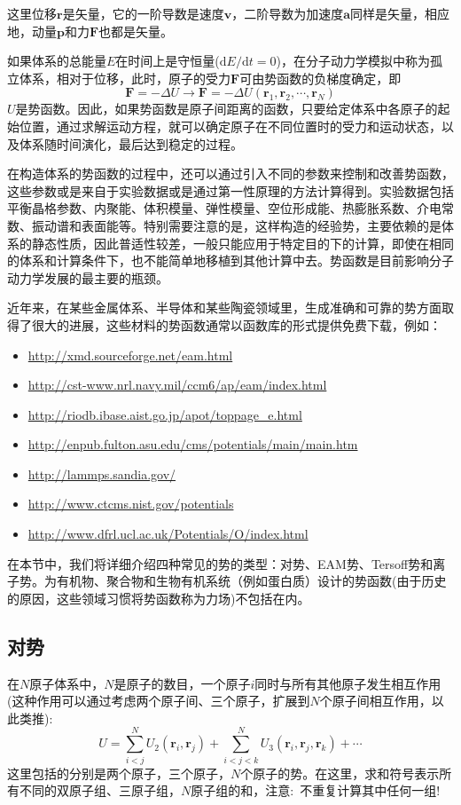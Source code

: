 这里位移$\mathbf{r}$是矢量，它的一阶导数是速度$\mathbf{v}$，二阶导数为加速度$\mathbf{a}$同样是矢量，相应地，动量$\mathbf{p}$和力$\mathbf{F}$也都是矢量。

如果体系的总能量$E$在时间上是守恒量($\mathrm{d}E/\mathrm{d}t=0$)，在分子动力学模拟中称为孤立体系，相对于位移，此时，原子的受力$\mathbf{F}$可由势函数的负梯度确定，即
\begin{equation}
	\mathbf{F}=-\Delta U\rightarrow\mathbf{F}=-\Delta U(\mathbf{r}_1,\mathbf{r}_2,\cdots,\mathbf{r}_N)
	\label{eq:Force_Potential}
\end{equation}
$U$是势函数。因此，如果势函数是原子间距离的函数，只要给定体系中各原子的起始位置，通过求解运动方程，就可以确定原子在不同位置时的受力和运动状态，以及体系随时间演化，最后达到稳定的过程。

在构造体系的势函数的过程中，还可以通过引入不同的参数来控制和改善势函数，这些参数或是来自于实验数据或是通过第一性原理的方法计算得到。实验数据包括平衡晶格参数、内聚能、体积模量、弹性模量、空位形成能、热膨胀系数、介电常数、振动谱和表面能等。特别需要注意的是，这样构造的经验势，主要依赖的是体系的静态性质，因此普适性较差，一般只能应用于特定目的下的计算，即使在相同的体系和计算条件下，也不能简单地移植到其他计算中去。势函数是目前影响分子动力学发展的最主要的瓶颈。

近年来，在某些金属体系、半导体和某些陶瓷领域里，生成准确和可靠的势方面取得了很大的进展，这些材料的势函数通常以函数库的形式提供免费下载，例如：
\begin{itemize}
	\item \url{http://xmd.sourceforge.net/eam.html}
	\item \url{http://cst-www.nrl.navy.mil/ccm6/ap/eam/index.html}
	\item \url{http://riodb.ibase.aist.go.jp/apot/toppage_e.html}
	\item \url{http://enpub.fulton.asu.edu/cms/potentials/main/main.htm}
	\item \url{http://lammps.sandia.gov/}
	\item \url{http://www.ctcms.nist.gov/potentials}
	\item \url{http://www.dfrl.ucl.ac.uk/Potentials/O/index.html}
\end{itemize}
在本节中，我们将详细介绍四种常见的势的类型：对势、\textrm{EAM}势、\textrm{Tersoff}势和离子势。为有机物、聚合物和生物有机系统（例如蛋白质）设计的势函数(由于历史的原因，这些领域习惯将势函数称为力场)不包括在内。%
\subsection{对势}
在$N$原子体系中，$N$是原子的数目，一个原子$i$同时与所有其他原子发生相互作用(这种作用可以通过考虑两个原子间、三个原子，扩展到$N$个原子间相互作用，以此类推):
\begin{equation}
	U=\sum_{i<j}^NU_2(\mathbf{r}_i,\mathbf{r}_j)+\sum_{i<j<k}^NU_3(\mathbf{r}_i,\mathbf{r}_j,\mathbf{r}_k)+\cdots
	\label{eq:interaction_atom}
\end{equation}
这里包括的分别是两个原子，三个原子，$N$个原子的势。在这里，求和符号表示所有不同的双原子组、三原子组，$N$原子组的和，注意:~不重复计算其中任何一组!

